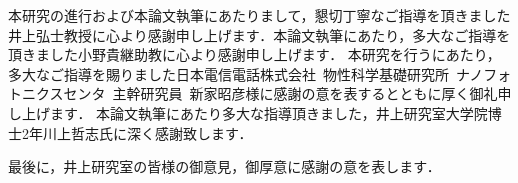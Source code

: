 \acknowledgment
本研究の進行および本論文執筆にあたりまして，懇切丁寧なご指導を頂きました井上弘士教授に心より感謝申し上げます．本論文執筆にあたり，多大なご指導を頂きました小野貴継助教に心より感謝申し上げます．
本研究を行うにあたり，多大なご指導を賜りました日本電信電話株式会社\ 物性科学基礎研究所\ ナノフォトニクスセンタ\ 主幹研究員\ 新家昭彦様に感謝の意を表するとともに厚く御礼申し上げます．
本論文執筆にあたり多大な指導頂きました，井上研究室大学院博士2年川上哲志氏に深く感謝致します．

最後に，井上研究室の皆様の御意見，御厚意に感謝の意を表します．

